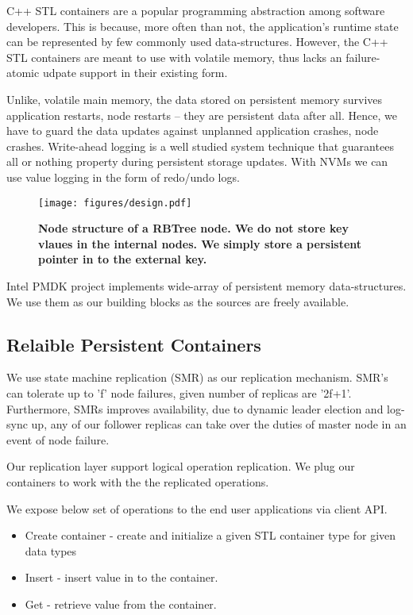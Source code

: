 C++ STL containers are a popular programming abstraction among software developers. This is because,
more often than not, the application's runtime state can be represented by few commonly used 
data-structures.  However, the C++ STL containers are meant to use with volatile memory, thus
lacks an failure-atomic udpate support in their existing form.

Unlike, volatile main memory, the data stored on persistent memory survives application restarts,
node restarts -- they are persistent data after all. Hence, we have to guard the data updates 
against unplanned application crashes, node crashes. Write-ahead logging is a well studied
system technique that guarantees all or nothing property during persistent storage updates.
With NVMs we can use value logging in the form of redo/undo logs.

\begin{figure}[]   
	\centering
	\texttt{[image: figures/design.pdf]} 
	\caption{\bf Node structure of a RBTree node. We do not store key vlaues in the internal nodes. We simply
	store a persistent pointer in to the external key.} 
	\label{fig:zerocopy} 
\end{figure}

Intel PMDK project implements wide-array of persistent memory data-structures. 
We use them as our building blocks as the sources are freely available. 

\subsection{Relaible Persistent Containers}

We use state machine replication (SMR) as our replication mechanism. SMR's can tolerate
up to 'f' node failures, given number of replicas are '2f+1'. Furthermore, SMRs improves
availability, due to dynamic leader election and log-sync up, any of our follower replicas
can take over the duties of master node in an event of node failure.

Our replication layer support logical operation replication. We plug our containers to work with
the the replicated operations. 

We expose below set of operations to the end user applications via client API.

\begin{itemize}
\item Create container - create and initialize a given STL container type for given data types
\item Insert - insert value in to the container.
\item Get - retrieve value from the container.
\end{itemize}

